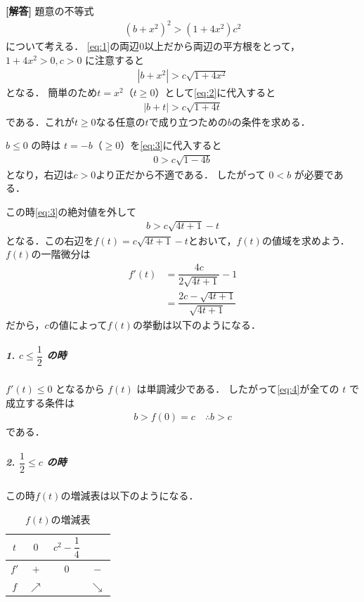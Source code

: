 \documentclass[../../main.tex]{subfiles}
\begin{document}
\begin{oframed}
  
\end{oframed}

{\bf [解答]}
題意の不等式
\begin{align}
  (b+x^2)^2 > (1+4x^2)c^2 \label{eq:1}
\end{align}
について考える．
\cref{eq:1}の両辺$0$以上だから両辺の平方根をとって，$1+4x^2>0, c>0$ に注意すると
\begin{align}
  |b+x^2|>c\sqrt{1+4x^2} \label{eq:2}
\end{align}
となる．
簡単のため$t=x^2$（$t\ge 0$）として\cref{eq:2}に代入すると
\begin{align}
  |b+t|>c\sqrt{1+4t} \label{eq:3}
\end{align}
である．これが$t \ge 0$なる任意の$t$で成り立つための$b$の条件を求める．

$b\le0$ の時は $t=-b$（$\ge0$）を\cref{eq:3}に代入すると
\begin{align}
  0>c\sqrt{1-4b}
\end{align}
となり，右辺は$c>0$より正だから不適である．
したがって $0<b$ が必要である．

この時\cref{eq:3}の絶対値を外して
\begin{align}
  b>c\sqrt{4t+1}-t \label{eq:4}
\end{align}
となる．この右辺を$f(t)=c\sqrt{4t+1}-t$とおいて，$f(t)$の値域を求めよう．
$f(t)$の一階微分は
\begin{align}
  f'(t)
  &=\dfrac{4c}{2\sqrt{4t+1}}-1 \\
  &=\dfrac{2c-\sqrt{4t+1}}{\sqrt{4t+1}}
\end{align}
だから，$c$の値によって$f(t)$の挙動は以下のようになる．

\subparagraph{1. $c\le\dfrac{1}{2}$ の時}

$f'(t)\le 0$ となるから $f(t)$ は単調減少である．
したがって\cref{eq:4}が全ての $t$ で成立する条件は
\begin{align}
  b>f(0)=c \quad \therefore b>c \label{eq:5}
\end{align}
である．

\subparagraph{2. $\dfrac{1}{2}\le c$ の時}

この時$f(t)$の増減表は以下のようになる．
\begin{table}[htb]
  \begin{center}
    \caption{$f(t)$の増減表}
    \begin{tabular}{c|c|c|c}
      $t$ & $0$ & $c^2-\dfrac{1}{4}$ & \\
      \hline
      $f'$ & $+$ & $0$ & $-$ \\
      \hline
      $f$ & $\nearrow$ & & $\searrow$
    \end{tabular}
  \end{center}
\end{table}
\end{document}
